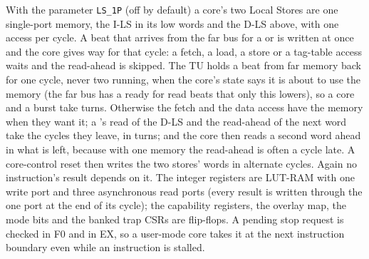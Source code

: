 With the parameter \texttt{LS\_1P} (off by default) a core's two Local Stores are one single-port
memory, the I-LS in its low words and the D-LS above, with one access per cycle. A beat that arrives
from the far bus for a  or  is written at once and the core gives way for that
cycle: a fetch, a load, a store or a tag-table access waits and the read-ahead is skipped. The TU
holds a beat from far memory back for one cycle, never two running, when the core's state says it is
about to use the memory (the far bus has a ready for read beats that only this lowers), so a core and
a burst take turns. Otherwise the
fetch and the data access have the memory when they want it; a 's read of the D-LS and the
read-ahead of the next word take the cycles they leave, in turns; and the core then reads a second
word ahead in what is left, because with one memory the read-ahead is often a cycle late. A core-control reset then writes the two stores'
words in alternate cycles. Again no instruction's result depends on it. The integer registers are LUT-RAM with one write port and three asynchronous read ports (every
result is written through the one port at the end of its cycle); the capability registers, the
overlay map, the mode bits and the banked trap CSRs are flip-flops. A pending stop
request is checked in F0 and in EX, so a user-mode core takes it at the next instruction boundary
even while an instruction is stalled.

